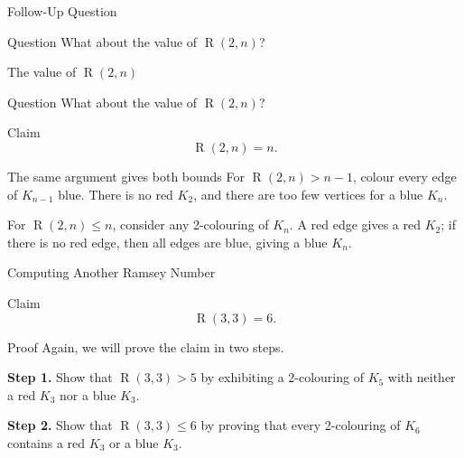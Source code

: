 \documentclass[aspectratio=169,11pt]{beamer}
\newcommand{\Ram}{\operatorname{R}}
\begin{document}
\begin{frame}[t]{Follow-Up Question}
\vspace{0.10cm}

\begin{block}{Question}
\large
What about the value of $\Ram(2,n)$?
\end{block}
\end{frame}

\begin{frame}[t]{The value of $\Ram(2,n)$}
\vspace{0.10cm}

\begin{block}{Question}
\large
What about the value of $\Ram(2,n)$?
\end{block}

\vspace{0.25cm}

\begin{alertblock}{Claim}
\large
\[
  \boxed{\Ram(2,n)=n}.
\]
\end{alertblock}

\begin{block}{The same argument gives both bounds}
\large
For $\Ram(2,n)>n-1$, colour every edge of $K_{n-1}$
\textcolor{RamBlue}{blue}. There is no \textcolor{RamRed}{red $K_2$}, and
there are too few vertices for a \textcolor{RamBlue}{blue $K_n$}.

\vspace{0.25cm}

For $\Ram(2,n)\le n$, consider any 2-colouring of $K_n$. A
\textcolor{RamRed}{red edge} gives a red $K_2$; if there is no red edge, then
all edges are \textcolor{RamBlue}{blue}, giving a blue $K_n$.
\end{block}
\end{frame}

\begin{frame}[t]{Computing Another Ramsey Number}
\vspace{0.10cm}

\begin{alertblock}{Claim}
\large
\[
  \boxed{\Ram(3,3)=6}.
\]
\end{alertblock}

\vspace{0.22cm}

\begin{block}{Proof}
\large
Again, we will prove the claim in two steps.

\vspace{0.20cm}

\textbf{Step 1.}
Show that $\Ram(3,3)>5$ by exhibiting a 2-colouring of $K_5$ with
neither a \textcolor{RamRed}{red $K_3$} nor a \textcolor{RamBlue}{blue $K_3$}.

\vspace{0.22cm}

\textbf{Step 2.}
Show that $\Ram(3,3)\le 6$ by proving that every 2-colouring of $K_6$
contains a \textcolor{RamRed}{red $K_3$} or a \textcolor{RamBlue}{blue $K_3$}.
\end{block}
\end{frame}
\end{document}
